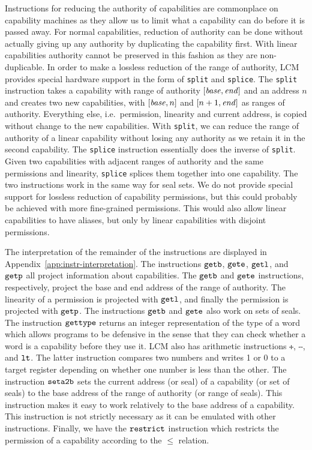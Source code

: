 \documentclass[acmsmall,screen]{acmart}\settopmatter{}
\newcommand{\trgcm}{\textsc{LCM}}
\newenvironment{jversion}%
    {\color{OliveGreen}}{}
\begin{document}
Instructions for reducing the authority of capabilities are commonplace on capability machines as they allow us to limit what a capability can do before it is passed away.
For normal capabilities, reduction of authority can be done without actually giving up any authority by duplicating the capability first.
With linear capabilities authority cannot be preserved in this fashion as they are non-duplicable.
In order to make a lossless reduction of the range of authority, \trgcm{} provides special hardware support in the form of \texttt{split} and \texttt{splice}.
The \texttt{split} instruction takes a capability with range of authority $[\mathit{base},\mathit{end}]$ and an address $n$ and creates two new capabilities, with $[\mathit{base},n]$ and $[n+1,\mathit{end}]$ as ranges of authority.
Everything else, i.e.\ permission, linearity and current address, is copied without change to the new capabilities.
With \texttt{split}, we can reduce the range of authority of a linear capability without losing any authority as we retain it in the second capability.
The \texttt{splice} instruction essentially does the inverse of \texttt{split}.
Given two capabilities with adjacent ranges of authority and the same permissions and linearity, \texttt{splice} splices them together into one capability.
The two instructions work in the same way for seal sets.
We do not provide special support for lossless reduction of capability permissions, but this could probably be achieved with more fine-grained permissions.
This would also allow linear capabilities to have aliases, but only by linear capabilities with disjoint permissions.

\begin{jversion}
  The interpretation of the remainder of the instructions are displayed in Appendix~\ref{app:instr-interpretation}.
  The instructions $\tgetb{}{}$, $\tgete{}{}$, $\tgetlin{}{}$, and $\tgetp{}{}$ all project information about capabilities.
  The $\tgetb{}{}$ and $\tgete{}{}$ instructions, respectively, project the base and end address of the range of authority.
  The linearity of a permission is projected with $\tgetlin{}{}$, and finally the permission is projected with $\tgetp{}{}$.
  The instructions $\tgetb{}{}$ and $\tgete{}{}$ also work on sets of seals.
  The instruction $\tisptr{}{}$ returns an integer representation of the type of a word which allows programs to be defensive in the sense that they can check whether a word is a capability before they use it.
  \trgcm{} also has arithmetic instructions $\tplus{}{}{}$, $\tminus{}{}{}$, and $\tlt{}{}{}$.
  The latter instruction compares two numbers and writes 1 or 0 to a target register depending on whether one number is less than the other.
  The instruction $\tsetatob{}$ sets the current address (or seal) of a capability (or set of seals) to the base address of the range of authority (or range of seals).
  This instruction makes it easy to work relatively to the base address of a capability.
  This instruction is not strictly necessary as it can be emulated with other instructions.
  Finally, we have the $\trestrict{}{}$ instruction which restricts the permission of a capability according to the $\le$ relation.
\end{jversion}
\end{document}
